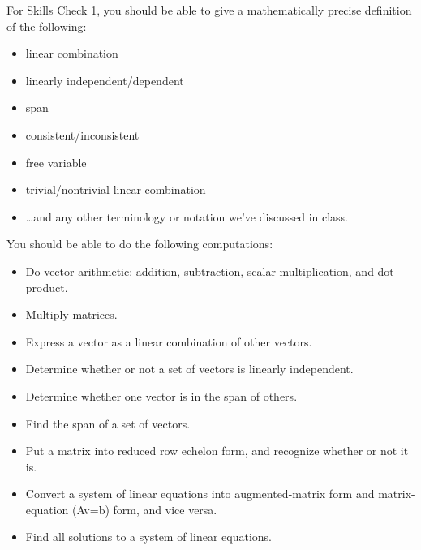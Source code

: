 \documentclass[10pt]{article}
\begin{document}
For Skills Check 1, you should be able to give a mathematically precise definition of the following:
\begin{itemize}
	\item linear combination
	\item linearly independent/dependent
	\item span
	\item consistent/inconsistent
	\item free variable
	\item trivial/nontrivial linear combination
	\item \ldots and any other terminology or notation we've discussed in class.
\end{itemize}

You should be able to do the following computations:
\begin{itemize}
	\item Do vector arithmetic: addition, subtraction, scalar multiplication, and dot product.
	\item Multiply matrices.
	\item Express a vector as a linear combination of other vectors.
	\item Determine whether or not a set of vectors is linearly independent.
	\item Determine whether one vector is in the span of others.
	\item Find the span of a set of vectors.
	\item Put a matrix into reduced row echelon form, and recognize whether or not it is.
	\item Convert a system of linear equations into augmented-matrix form and matrix-equation (Av=b) form, and vice versa.
	\item Find all solutions to a system of linear equations.
\end{itemize}
\end{document}

